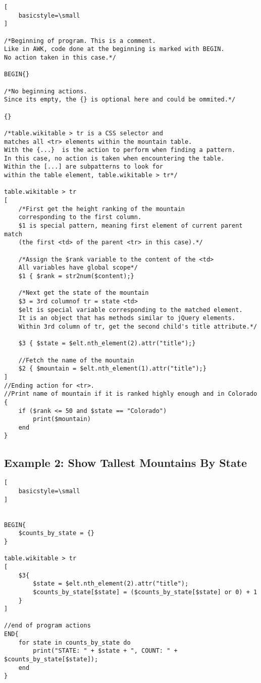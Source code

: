 \documentclass[12pt]{article}
\begin{document}
\begin{lstlisting}[
    basicstyle=\small
]

/*Beginning of program. This is a comment.
Like in AWK, code done at the beginning is marked with BEGIN.
No action taken in this case.*/

BEGIN{}

/*No beginning actions.
Since its empty, the {} is optional here and could be ommited.*/

{}

/*table.wikitable > tr is a CSS selector and
matches all <tr> elements within the mountain table.
With the {...}  is the action to perform when finding a pattern.
In this case, no action is taken when encountering the table.
Within the [...] are subpatterns to look for 
within the table element, table.wikitable > tr*/

table.wikitable > tr
[
	/*First get the height ranking of the mountain
	corresponding to the first column.
	$1 is special pattern, meaning first element of current parent match
	(the first <td> of the parent <tr> in this case).*/

	/*Assign the $rank variable to the content of the <td>
	All variables have global scope*/
	$1 { $rank = str2num($content);}

	/*Next get the state of the mountain
	$3 = 3rd columnof tr = state <td>
	$elt is special variable corresponding to the matched element.
	It is an object that has methods similar to jQuery elements.
	Within 3rd column of tr, get the second child's title attribute.*/
	
	$3 { $state = $elt.nth_element(2).attr("title");}

	//Fetch the name of the mountain
	$2 { $mountain = $elt.nth_element(1).attr("title");}
]
//Ending action for <tr>.
//Print name of mountain if it is ranked highly enough and in Colorado
{
	if ($rank <= 50 and $state == "Colorado")
		print($mountain)
	end
}
\end{lstlisting}

\subsection*{Example 2: Show Tallest Mountains By State}

\begin{lstlisting}[
    basicstyle=\small
]


BEGIN{
	$counts_by_state = {}
}

table.wikitable > tr
[
	$3{
		$state = $elt.nth_element(2).attr("title");
		$counts_by_state[$state] = ($counts_by_state[$state] or 0) + 1
	}
]

//end of program actions
END{
	for state in counts_by_state do
		print("STATE: " + $state + ", COUNT: " + $counts_by_state[$state]);
	end
}

\end{lstlisting}
\end{document}
